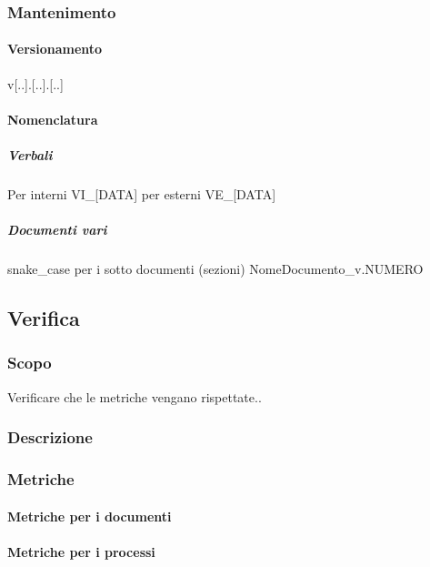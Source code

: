			

		\subsubsection{Mantenimento}

			\paragraph{Versionamento} \label{Versionamento}
			v[..].[..].[..]

			\paragraph{Nomenclatura}

			\subparagraph{Verbali}
			Per interni		VI\_[DATA]
			per esterni		VE\_[DATA]

			\subparagraph{Documenti vari}
			snake\_case per i sotto documenti (sezioni)
			NomeDocumento\_v.NUMERO

	\subsection{Verifica}

		\subsubsection{Scopo}
		Verificare che le metriche vengano rispettate..


		\subsubsection{Descrizione}

		\subsubsection{Metriche}

			\paragraph{Metriche per i documenti}
			
			\paragraph{Metriche per i processi}

